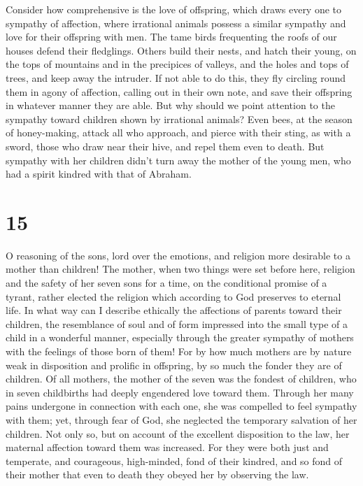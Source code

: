  Consider how comprehensive is the love of offspring,
which draws every one to sympathy of affection,  where
irrational animals possess a similar sympathy and love for their
offspring with men.  The tame birds frequenting the roofs
of our houses defend their fledglings.  Others build
their nests, and hatch their young, on the tops of mountains and in the
precipices of valleys, and the holes and tops of trees, and keep away
the intruder.  If not able to do this, they fly circling
round them in agony of affection, calling out in their own note, and
save their offspring in whatever manner they are able. 
But why should we point attention to the sympathy toward children shown
by irrational animals?  Even bees, at the season of
honey-making, attack all who approach, and pierce with their sting, as
with a sword, those who draw near their hive, and repel them even to
death.  But sympathy with her children didn't turn away
the mother of the young men, who had a spirit kindred with that of
Abraham.

\hypertarget{section-14}{%
\section{15}\label{section-14}}

 O reasoning of the sons, lord over the emotions, and
religion more desirable to a mother than children!  The
mother, when two things were set before here, religion and the safety of
her seven sons for a time, on the conditional promise of a tyrant,
 rather elected the religion which according to God
preserves to eternal life.  In what way can I describe
ethically the affections of parents toward their children, the
resemblance of soul and of form impressed into the small type of a child
in a wonderful manner, especially through the greater sympathy of
mothers with the feelings of those born of them!  For by
how much mothers are by nature weak in disposition and prolific in
offspring, by so much the fonder they are of children.  Of
all mothers, the mother of the seven was the fondest of children, who in
seven childbirths had deeply engendered love toward them. 
Through her many pains undergone in connection with each one, she was
compelled to feel sympathy with them;  yet, through fear
of God, she neglected the temporary salvation of her children.
 Not only so, but on account of the excellent disposition
to the law, her maternal affection toward them was increased.
 For they were both just and temperate, and courageous,
high-minded, fond of their kindred, and so fond of their mother that
even to death they obeyed her by observing the law.

